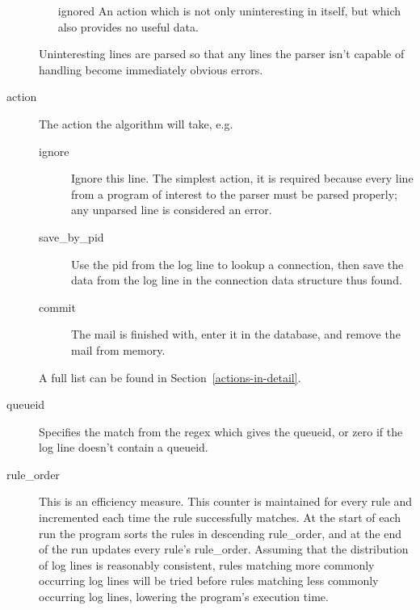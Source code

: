 \documentclass[a4paper,12pt,draft]{article}
\begin{document}
\begin{description}
\begin{itemize}
            \item [ignored] An action which is not only uninteresting in
                itself, but which also provides no useful data.

        \end{itemize}

        Uninteresting lines are parsed so that any lines the parser isn't
        capable of handling become immediately obvious errors.

    \item [action] The action the algorithm will take, e.g.
        \begin{description}

            \item [ignore] Ignore this line.  The simplest action, it is
                required because every line from a program of interest to
                the parser must be parsed properly; any unparsed line is
                considered an error.

            \item [save\_by\_pid] Use the pid from the log line to lookup a
                connection, then save the data from the log line in the
                connection data structure thus found.

            \item [commit] The mail is finished with, enter it in the
                database, and remove the mail from memory.

        \end{description}

        A full list can be found in Section~\ref{actions-in-detail}.

    \item [queueid] Specifies the match from the regex which gives the
        queueid, or zero if the log line doesn't contain a queueid.

    \item [rule\_order] This is an efficiency measure.  This counter is
        maintained for every rule and incremented each time the rule
        successfully matches.  At the start of each run the program sorts
        the rules in descending rule\_order, and at the end of the run
        updates every rule's rule\_order.  Assuming that the distribution
        of log lines is reasonably consistent, rules matching more commonly
        occurring log lines will be tried before rules matching less
        commonly occurring log lines, lowering the program's execution
        time.


\end{description}
\end{document}

